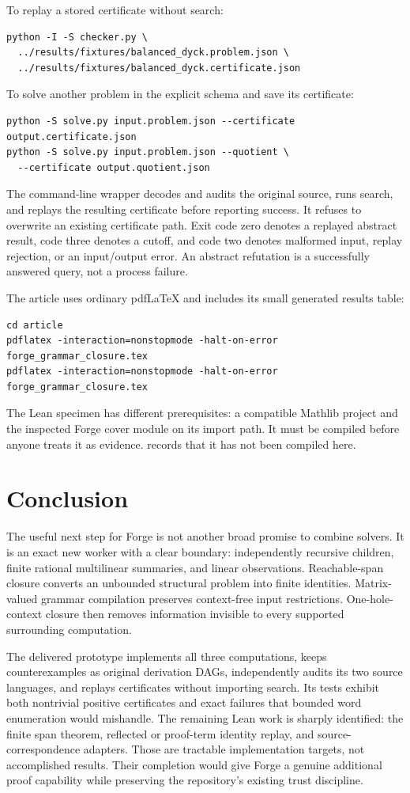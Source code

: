 \documentclass[11pt,letterpaper]{article}
\theoremstyle{definition}\newtheorem{definition}[theorem]{Definition}
\theoremstyle{remark}\newtheorem{remark}[theorem]{Remark}
\begin{document}
To replay a stored certificate without search:
\begin{lstlisting}
python -I -S checker.py \
  ../results/fixtures/balanced_dyck.problem.json \
  ../results/fixtures/balanced_dyck.certificate.json
\end{lstlisting}
To solve another problem in the explicit schema and save its certificate:
\begin{lstlisting}
python -S solve.py input.problem.json --certificate output.certificate.json
python -S solve.py input.problem.json --quotient \
  --certificate output.quotient.json
\end{lstlisting}
The command-line wrapper decodes and audits the original source, runs search, and replays the resulting certificate before reporting success. It refuses to overwrite an existing certificate path. Exit code zero denotes a replayed abstract result, code three denotes a cutoff, and code two denotes malformed input, replay rejection, or an input/output error. An abstract refutation is a successfully answered query, not a process failure.

The article uses ordinary pdfLaTeX and includes its small generated results table:
\begin{lstlisting}
cd article
pdflatex -interaction=nonstopmode -halt-on-error forge_grammar_closure.tex
pdflatex -interaction=nonstopmode -halt-on-error forge_grammar_closure.tex
\end{lstlisting}
The Lean specimen has different prerequisites: a compatible Mathlib project and the inspected Forge cover module on its import path. It must be compiled before anyone treats it as evidence.  records that it has not been compiled here.

\section{Conclusion}
The useful next step for Forge is not another broad promise to combine solvers. It is an exact new worker with a clear boundary: independently recursive children, finite rational multilinear summaries, and linear observations. Reachable-span closure converts an unbounded structural problem into finite identities. Matrix-valued grammar compilation preserves context-free input restrictions. One-hole-context closure then removes information invisible to every supported surrounding computation.

The delivered prototype implements all three computations, keeps counterexamples as original derivation DAGs, independently audits its two source languages, and replays certificates without importing search. Its tests exhibit both nontrivial positive certificates and exact failures that bounded word enumeration would mishandle. The remaining Lean work is sharply identified: the finite span theorem, reflected or proof-term identity replay, and source-correspondence adapters. Those are tractable implementation targets, not accomplished results. Their completion would give Forge a genuine additional proof capability while preserving the repository's existing trust discipline.
\end{document}
